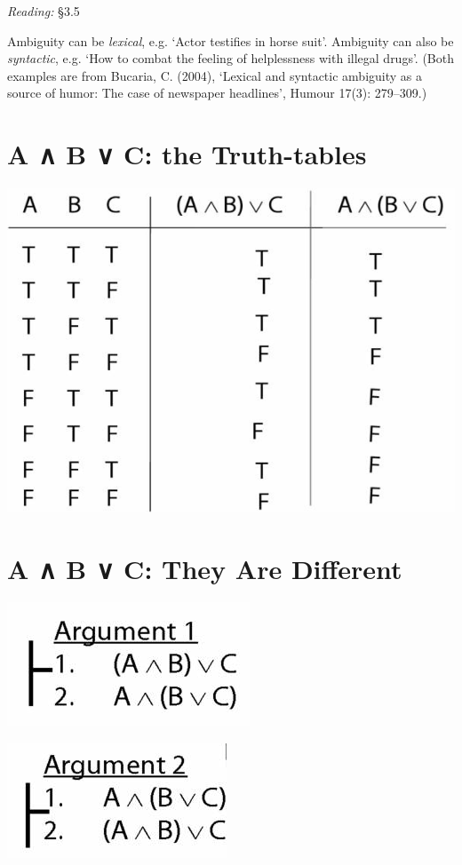 \documentclass[12pt]{extarticle}
\begin{document}
\begin{multicols*}{3}
\emph{Reading:} §3.5
 
Ambiguity can be \emph{lexical}, e.g. `Actor testifies in horse suit'. Ambiguity can also be \emph{syntactic}, e.g. `How to combat the feeling of helplessness with illegal drugs'. (Both examples are from Bucaria, C. (2004), `Lexical and syntactic ambiguity as a source of humor: The case of newspaper headlines', Humour 17(3): 279--309.)
 
 
 
\section{A ∧ B ∨ C: the Truth-tables}
 
\begin{center}
\includegraphics[scale=0.3]{img/tt_unit_153.png}
\end{center}
 
 
\section{A ∧ B ∨ C: They Are Different}
 
\begin{center}
\includegraphics[scale=0.3]{img/arg1_unit_153.png}
\end{center}
\begin{center}
\includegraphics[scale=0.3]{img/arg2_unit_153.png}
\end{center}
 

\end{multicols*}
\end{document}
